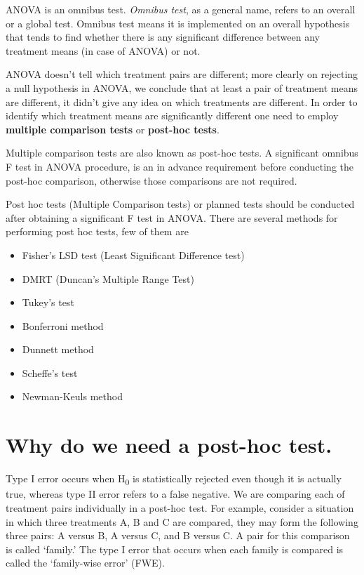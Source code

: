 \documentclass[
]{book}
\begin{document}
ANOVA is an omnibus test. \emph{Omnibus test}, as a general name, refers to an overall or a global test. Omnibus test means it is implemented on an overall hypothesis that tends to find whether there is any significant difference between any treatment means (in case of ANOVA) or not.

ANOVA doesn't tell which treatment pairs are different; more clearly on rejecting a null hypothesis in ANOVA, we conclude that at least a pair of treatment means are different, it didn't give any idea on which treatments are different. In order to identify which treatment means are significantly different one need to employ \textbf{multiple comparison tests} or \textbf{post-hoc tests}.

Multiple comparison tests are also known as post-hoc tests. A significant omnibus F test in ANOVA procedure, is an in advance requirement before conducting the post-hoc comparison, otherwise those comparisons are not required.

Post hoc tests (Multiple Comparison tests) or planned tests should be conducted after obtaining a significant F test in ANOVA. There are several methods for performing post hoc tests, few of them are

\begin{itemize}
\item
  Fisher's LSD test (Least Significant Difference test)
\item
  DMRT (Duncan's Multiple Range Test)
\item
  Tukey's test
\item
  Bonferroni method
\item
  Dunnett method
\item
  Scheffe's test
\item
  Newman-Keuls method
\end{itemize}

\hypertarget{why-do-we-need-a-post-hoc-test.}{%
\section{Why do we need a post-hoc test.}\label{why-do-we-need-a-post-hoc-test.}}

Type I error occurs when H\textsubscript{0} is statistically rejected even though it is actually true, whereas type II error refers to a false negative. We are comparing each of treatment pairs individually in a post-hoc test. For example, consider a situation in which three treatments A, B and C are compared, they may form the following three pairs: A versus B, A
versus C, and B versus C. A pair for this comparison is called `family.' The type I error that occurs when each family is compared is called the `family-wise error' (FWE).\citep{Lee}
\end{document}
